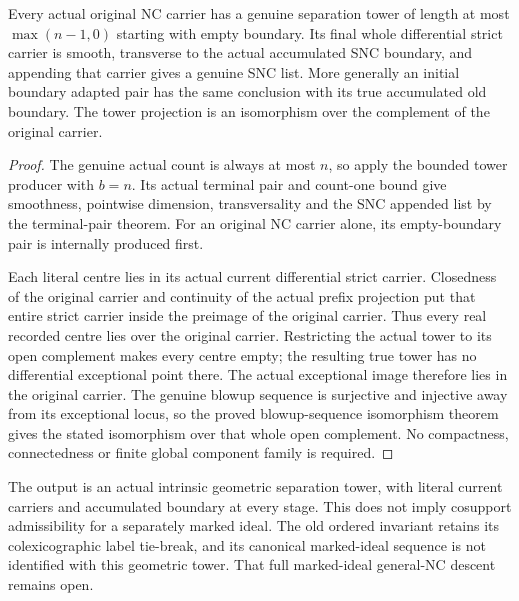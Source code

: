 \begin{theorem}
\label{hir:general-nc-global-separation-complement-isomorphism}
\leanok
{}
Every actual original NC carrier has a genuine separation tower of
length at most $\max(n-1,0)$ starting with empty boundary. Its final
whole differential strict carrier is smooth, transverse to the
actual accumulated SNC boundary, and appending that carrier gives
a genuine SNC list. More generally an initial boundary adapted pair
has the same conclusion with its true accumulated old boundary.
The tower projection is an isomorphism over the complement of the
original carrier.
\end{theorem}
\begin{proof}
The genuine actual count is always at most $n$, so apply the bounded
tower producer with $b=n$. Its actual terminal pair and count-one
bound give smoothness, pointwise dimension, transversality and the
SNC appended list by the terminal-pair theorem. For an original NC
carrier alone, its empty-boundary pair is internally produced first.

Each literal centre lies in its actual current differential strict
carrier. Closedness of the original carrier and continuity of the
actual prefix projection put that entire strict carrier inside the
preimage of the original carrier. Thus every real recorded centre
lies over the original carrier. Restricting the actual tower to its
open complement makes every centre empty; the resulting true tower
has no differential exceptional point there. The actual exceptional
image therefore lies in the original carrier. The genuine blowup
sequence is surjective and injective away from its exceptional locus,
so the proved blowup-sequence isomorphism theorem gives the stated
isomorphism over that whole open complement. No compactness,
connectedness or finite global component family is required.
\end{proof}

\begin{remark}
The output is an actual intrinsic geometric separation tower, with
literal current carriers and accumulated boundary at every stage.
This does not imply cosupport admissibility for a separately marked
ideal. The old ordered invariant retains its colexicographic label
tie-break, and its canonical marked-ideal sequence is not identified
with this geometric tower. That full marked-ideal general-NC descent
remains open.
\end{remark}

